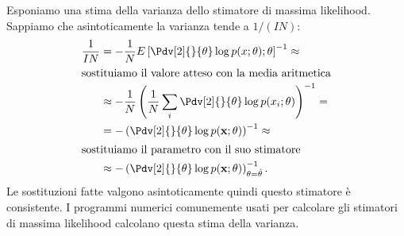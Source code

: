 Esponiamo una stima della varianza dello stimatore di massima likelihood.
Sappiamo che asintoticamente la varianza tende a $1/(IN)$:
\begin{align*}
	\frac1{IN}
	&= -\frac1N E \left[ \Pdv[2]{}{\theta} \log p(x;\theta); \theta \right]^{-1} \approx \\
	\intertext{sostituiamo il valore atteso con la media aritmetica}
	&\approx -\frac1N \left( \frac1N \sum_i \Pdv[2]{}{\theta} \log p(x_i;\theta) \right)^{-1} = \\
	&= - \left( \Pdv[2]{}{\theta} \log p(\mathbf x;\theta) \right)^{-1} \approx \\
	\intertext{sostituiamo il parametro con il suo stimatore}
	&\approx - \left( \Pdv[2]{}{\theta} \log p(\mathbf x;\theta) \right)^{-1}_{\theta=\hat\theta}.
\end{align*}
Le sostituzioni fatte valgono asintoticamente quindi questo stimatore è consistente.
I programmi numerici comunemente usati per calcolare gli stimatori di massima likelihood calcolano questa stima della varianza.
